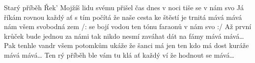 \begin{TEXT}{Starý příběh}
\SLOKA Řek'  Mojžíš lidu svému přišel čas \NL
dnes v noci tiše  se   \NL
{}v nám  svo 
\SLOKA Já říkám rovnou každý ať s tím počítá \NL
že naše cesta ke štěstí je trnitá \NL
mává mává nám všem svobodná zem 
\REFREN  /:  se bojí vodou  \NL
ten  tónu faraonů   \NL
{}v nám  svo   :/
\SLOKA Až první krůček bude jednou za námi \NL
tak nikdo nesmí zaváhat dát na fámy \NL
mává mává… 
\SLOKA Pak tenhle vandr všem potomkům ukáže \NL
že šanci má jen ten kdo má dost kuráže \NL
mává mává… 
\REFREN  
\SLOKA Ten rý příběh ble vám tu klá \NL
ať každý ví že hodnout se   \NL
{} mává… 
\end{TEXT}
